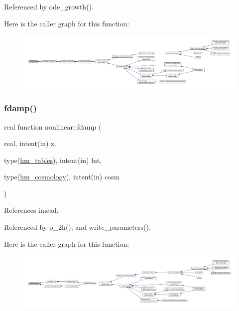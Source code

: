 Referenced by ode\+\_\+growth().

Here is the caller graph for this function\+:
\nopagebreak
\begin{figure}[H]
\begin{center}
\leavevmode
\includegraphics[width=350pt]{namespacenonlinear_a7f8c8180d41c0771e383f7edaa516803_icgraph}
\end{center}
\end{figure}
\mbox{\label{namespacenonlinear_aea62820c73faaebffe8f3a0dce00a711}} 
\subsubsection{\texorpdfstring{fdamp()}{fdamp()}}
{\footnotesize\ttfamily real function nonlinear\+::fdamp (\begin{DoxyParamCaption}\item[{real, intent(in)}]{z,  }\item[{type(\mbox{\hyperlink{structnonlinear_1_1hm__tables}{hm\+\_\+tables}}), intent(in)}]{lut,  }\item[{type(\mbox{\hyperlink{structnonlinear_1_1hm__cosmology}{hm\+\_\+cosmology}}), intent(in)}]{cosm }\end{DoxyParamCaption})\hspace{0.3cm}{\ttfamily [private]}}



References imead.



Referenced by p\+\_\+2h(), and write\+\_\+parameters().

Here is the caller graph for this function\+:
\nopagebreak
\begin{figure}[H]
\begin{center}
\leavevmode
\includegraphics[width=350pt]{namespacenonlinear_aea62820c73faaebffe8f3a0dce00a711_icgraph}
\end{center}
\end{figure}
\mbox{\label{namespacenonlinear_af9e22f2a04a3c5dc0f45fcd96c9b28cb}} 
